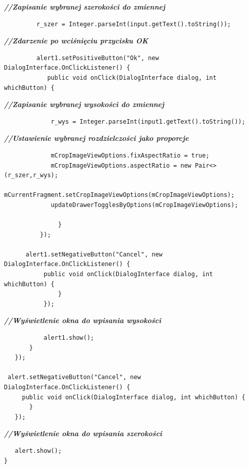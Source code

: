                                \textit{\textbf{//Zapisanie wybranej szerokości do zmiennej}}
                                 \begin{verbatim}
         r_szer = Integer.parseInt(input.getText().toString());\end{verbatim}
                                   \textit{\textbf{//Zdarzenie po wciśnięciu przycisku OK}}
                                     \begin{verbatim}
         alert1.setPositiveButton("Ok", new DialogInterface.OnClickListener() {
            public void onClick(DialogInterface dialog, int whichButton) {\end{verbatim}
                                      \textit{\textbf{//Zapisanie wybranej wysokości do zmiennej}}
                                        \begin{verbatim}
             r_wys = Integer.parseInt(input1.getText().toString());\end{verbatim}
                                       \textit{\textbf{//Ustawienie wybranej rozdzielczości jako proporcje}}
                                         \begin{verbatim}
             mCropImageViewOptions.fixAspectRatio = true;
             mCropImageViewOptions.aspectRatio = new Pair<>(r_szer,r_wys);
             mCurrentFragment.setCropImageViewOptions(mCropImageViewOptions);
             updateDrawerTogglesByOptions(mCropImageViewOptions);

               }
          });

      alert1.setNegativeButton("Cancel", new DialogInterface.OnClickListener() {
           public void onClick(DialogInterface dialog, int whichButton) {
               }
           });\end{verbatim}
                                     \textit{\textbf{//Wyświetlenie okna do wpisania wysokości }}
                                       \begin{verbatim}
           alert1.show();
       }
   });

 alert.setNegativeButton("Cancel", new DialogInterface.OnClickListener() {
     public void onClick(DialogInterface dialog, int whichButton) {
       }
   });\end{verbatim}
                             \textit{\textbf{//Wyświetlenie okna do wpisania szerokości}}
                               \begin{verbatim}
   alert.show();
}
\end{verbatim}

